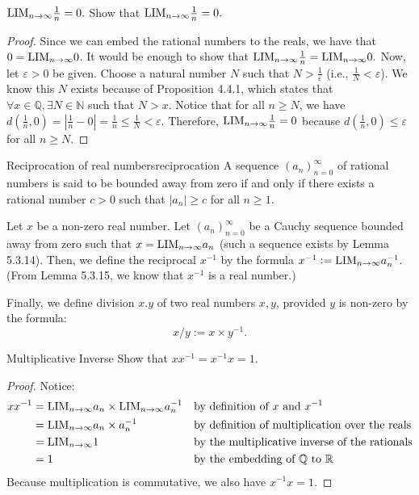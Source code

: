 \begin{problem}{$\text{LIM}_{n \to \infty} \frac{1}{n} = 0.$}
Show that $\text{LIM}_{n \to \infty} \frac{1}{n} = 0.$
\end{problem}
\begin{proof}
    Since we can embed the rational numbers to the reals, we have that $0 = \text{LIM}_{n \to \infty} 0$.
    It would be enough to show that $\text{LIM}_{n \to \infty} \frac{1}{n} = \text{LIM}_{n \to \infty} 0.$
    Now, let $\varepsilon > 0$ be given.
    Choose a natural number $N$ such that $N > \frac{1}{\varepsilon}$ (i.e., $\frac{1}{N} < \varepsilon$).
    We know this $N$ exists because of Proposition 4.4.1, which states that $\forall x \in \mathbb{Q}, \exists N \in \mathbb{N}$ such that $N > x$.
    Notice that for all $n \geq N$, we have $d(\frac{1}{n}, 0) = |\frac{1}{n} - 0| = \frac{1}{n} \leq \frac{1}{N} < \varepsilon$. 
    Therefore, $\text{LIM}_{n \to \infty} \frac{1}{n} = 0$ because $d(\frac{1}{n}, 0) \leq \varepsilon$ for all $n \geq N.$
\end{proof}

\begin{definition}{Reciprocation of real numbers}{reciprocation}
    A sequence $(a_n)_{n=0}^\infty$ of rational numbers is said to be bounded away from zero if and only if
    there exists a rational number $c > 0$ such that $|a_n| \geq c$ for all $n \geq 1.$
    
    Let $x$ be a non-zero real number. 
    Let $(a_n)_{n=0}^\infty$ be a Cauchy sequence bounded away from zero such that $x = \text{LIM}_{n \to \infty} a_n$ (such a sequence exists by Lemma 5.3.14).
    Then, we define the reciprocal $x^{-1}$ by the formula $x^{-1} := \text{LIM}_{n \to \infty} a_n^{-1}$.
    (From Lemma 5.3.15, we know that $x^{-1}$ is a real number.)

    Finally, we define division $x.y$ of two real numbers $x, y$, provided $y$ is non-zero by the formula:
    $$x/y := x \times y^{-1}.$$
\end{definition}

\begin{problem}{Multiplicative Inverse}
    Show that $xx^{-1} = x^{-1}x= 1$.
\end{problem}

\begin{proof}
    Notice:
    \begin{align*}
        xx^{-1} &= \text{LIM}_{n \to \infty} a_n \times \text{LIM}_{n \to \infty} a_n^{-1} &&\text{by definition of $x$ and $x^{-1}$}\\
        &= \text{LIM}_{n \to \infty} a_n \times a_n^{-1} &&\text{by definition of multiplication over the reals} \\
        &= \text{LIM}_{n \to \infty} 1 &&\text{by the multiplicative inverse of the rationals}\\
        &= 1 &&\text{by the embedding of $\mathbb{Q}$ to $\mathbb{R}$}
    \end{align*}
    Because multiplication is commutative, we also have $x^{-1} x = 1.$
\end{proof}